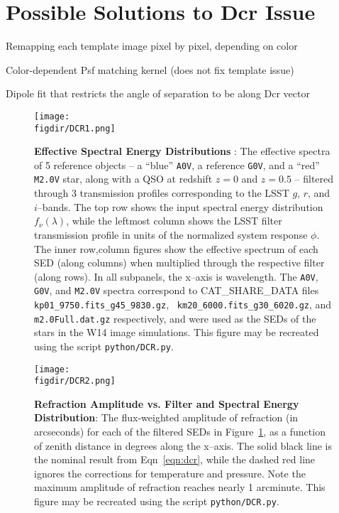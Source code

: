 \documentclass[prd, nofootinbib, floatfix, 11pt, tightenlines, times]{article}
\def\figdir{../figures}
\begin{document}
\section{Possible Solutions to Dcr Issue}

Remapping each template image pixel by pixel, depending on color

Color-dependent Psf matching kernel (does not fix template issue)

Dipole fit that restricts the angle of separation to be along Dcr vector


\clearpage
\begin{figure}[h!]
  \centering
  \texttt{[image: \\figdir/DCR1.png]}
  \caption{{\bf Effective Spectral Energy Distributions} : The
    effective spectra of 5 reference objects -- a ``blue'' {\tt A0V},
    a reference {\tt G0V}, and a ``red'' {\tt M2.0V} star, along with
    a QSO at redshift $z=0$ and $z=0.5$ -- filtered through 3
    transmission profiles corresponding to the LSST $g$, $r$, and
    $i$--bands.  The top row shows the input spectral energy
    distribution $f_\nu(\lambda)$, while the leftmost column shows the
    LSST filter transmission profile in units of the normalized
    system response $\phi$.  The inner row,column figures show the
    effective spectrum of each SED (along columns) when multiplied
    through the respective filter (along rows).  In all subpanels, the
    x--axis is wavelength.  The {\tt A0V}, {\tt G0V}, and {\tt M2.0V}
    spectra correspond to {CAT\_SHARE\_DATA} files {\tt
      kp01\_9750.fits\_g45\_9830.gz}, {\tt
      km20\_6000.fits\_g30\_6020.gz}, and {\tt m2.0Full.dat.gz}
    respectively, and were used as the SEDs of the stars in the W14
    image simulations.  This figure may be recreated using the script
    {\tt python/DCR.py}.}
  \label{fig:spectra}
\end{figure}

\clearpage
\begin{figure}[h!]
  \centering
  \texttt{[image: \\figdir/DCR2.png]}
  \caption{{\bf Refraction Amplitude vs. Filter and Spectral Energy
      Distribution}: The flux-weighted amplitude of refraction (in
    arcseconds) for each of the filtered SEDs in
    Figure~\ref{fig:spectra}, as a function of zenith distance in
    degrees along the x--axis.  The solid black line is the nominal
    result from Eqn~\ref{eqn:dcr}, while the dashed red line ignores
    the corrections for temperature and pressure.  Note the maximum
    amplitude of refraction reaches nearly 1 arcminute.  This figure
    may be recreated using the script {\tt python/DCR.py}.}
  \label{fig:refraction}
\end{figure}
\end{document}
